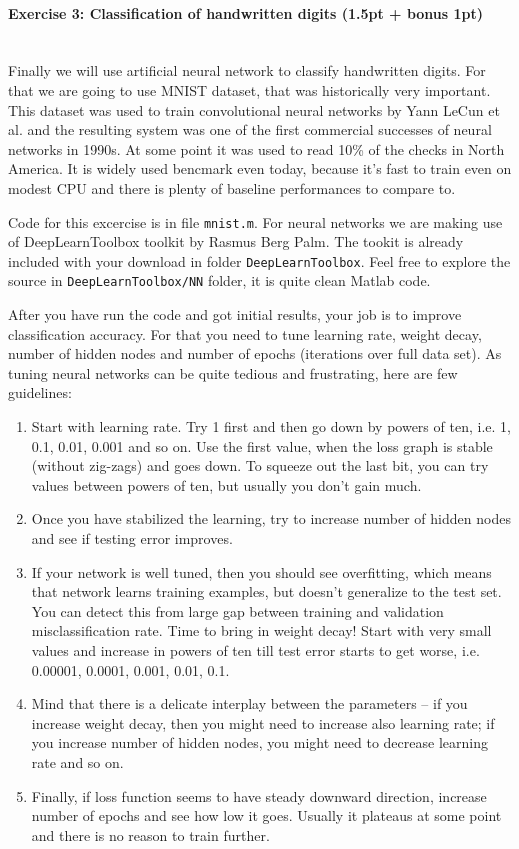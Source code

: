 \documentclass[a4paper,11pt]{article}
\newenvironment{exercise}[3]{\paragraph{Exercise #1: #2 (#3pt)}\ \\}{
\medskip}
\begin{document}
%
%
\begin{exercise}{3}{Classification of handwritten digits}{1.5pt + bonus 1}

Finally we will use artificial neural network to classify handwritten digits. For that we are going to use MNIST dataset, that was historically very important. This dataset was used to train convolutional neural networks by Yann LeCun et al. and the resulting system was one of the first commercial successes of neural networks in 1990s. At some point it was used to read 10\% of the checks in North America. It is widely used bencmark even today, because it's fast to train even on modest CPU and there is plenty of baseline performances to compare to.

Code for this excercise is in file \texttt{mnist.m}. For neural networks we are making use of DeepLearnToolbox toolkit by Rasmus Berg Palm. The tookit is already included with your download in folder \texttt{DeepLearnToolbox}. Feel free to explore the source in \texttt{DeepLearnToolbox/NN} folder, it is quite clean Matlab code.

After you have run the code and got initial results, your job is to improve classification accuracy. For that you need to tune learning rate, weight decay, number of hidden nodes and number of epochs (iterations over full data set). As tuning neural networks can be quite tedious and frustrating, here are few guidelines:

\begin{enumerate}
  \item Start with learning rate. Try 1 first and then go down by powers of ten, i.e. 1, 0.1, 0.01, 0.001 and so on. Use the first value, when the loss graph is stable (without zig-zags) and goes down. To squeeze out the last bit, you can try values between powers of ten, but usually you don't gain much.
  \item Once you have stabilized the learning, try to increase number of hidden nodes and see if testing error improves. 
  \item If your network is well tuned, then you should see overfitting, which means that network learns training examples, but doesn't generalize to the test set. You can detect this from large gap between training and validation misclassification rate. Time to bring in weight decay! Start with very small values and increase in powers of ten till test error starts to get worse, i.e. 0.00001, 0.0001, 0.001, 0.01, 0.1.
  \item Mind that there is a delicate interplay between the parameters – if you increase weight decay, then you might need to increase also learning rate; if you increase number of hidden nodes, you might need to decrease learning rate and so on.
  \item Finally, if loss function seems to have steady downward direction, increase number of epochs and see how low it goes. Usually it plateaus at some point and there is no reason to train further.
\end{enumerate}


\end{exercise}
\end{document}
